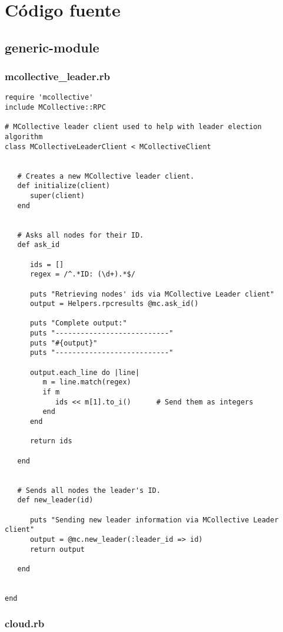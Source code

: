 \chapter{Código fuente}
\label{anx:codigo}


\section{generic-module}
\subsection{mcollective\_leader.rb}


\begin{lstlisting}
require 'mcollective'
include MCollective::RPC

# MCollective leader client used to help with leader election algorithm
class MCollectiveLeaderClient < MCollectiveClient
   
   
   # Creates a new MCollective leader client.
   def initialize(client)
      super(client)
   end
   
   
   # Asks all nodes for their ID.
   def ask_id
   
      ids = []
      regex = /^.*ID: (\d+).*$/
   
      puts "Retrieving nodes' ids via MCollective Leader client"
      output = Helpers.rpcresults @mc.ask_id()
      
      puts "Complete output:"
      puts "---------------------------"
      puts "#{output}"
      puts "---------------------------"
      
      output.each_line do |line|
         m = line.match(regex)
         if m
            ids << m[1].to_i()      # Send them as integers
         end
      end
      
      return ids
   
   end
   
   
   # Sends all nodes the leader's ID.
   def new_leader(id)
   
      puts "Sending new leader information via MCollective Leader client"
      output = @mc.new_leader(:leader_id => id)
      return output
   
   end
   
   
end
\end{lstlisting}


\subsection{cloud.rb}


